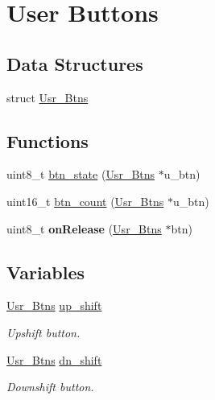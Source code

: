 \hypertarget{group__usr_btns}{\section{User Buttons}
\label{group__usr_btns}
}
\subsection*{Data Structures}
\begin{DoxyCompactItemize}
\item 
struct \hyperlink{struct_usr___btns}{Usr\-\_\-\-Btns}
\end{DoxyCompactItemize}
\subsection*{Functions}
\begin{DoxyCompactItemize}
\item 
uint8\-\_\-t \hyperlink{group__usr_btns_ga12edd371195cb085c440d64794fdf9ea}{btn\-\_\-state} (\hyperlink{struct_usr___btns}{Usr\-\_\-\-Btns} $\ast$u\-\_\-btn)
\item 
uint16\-\_\-t \hyperlink{group__usr_btns_ga10ac2ecdef1d96d9ef177f948817bbb3}{btn\-\_\-count} (\hyperlink{struct_usr___btns}{Usr\-\_\-\-Btns} $\ast$u\-\_\-btn)
\item 
\hypertarget{group__usr_btns_ga2f0699e265a6cc26a98e3470366b5cda}{uint8\-\_\-t {\bfseries on\-Release} (\hyperlink{struct_usr___btns}{Usr\-\_\-\-Btns} $\ast$btn)}\label{group__usr_btns_ga2f0699e265a6cc26a98e3470366b5cda}

\end{DoxyCompactItemize}
\subsection*{Variables}
\begin{DoxyCompactItemize}
\item 
\hypertarget{group__usr_btns_ga18ee634a9df9ed1ca0c7af2e021cec0f}{\hyperlink{struct_usr___btns}{Usr\-\_\-\-Btns} \hyperlink{group__usr_btns_ga18ee634a9df9ed1ca0c7af2e021cec0f}{up\-\_\-shift}}\label{group__usr_btns_ga18ee634a9df9ed1ca0c7af2e021cec0f}

\begin{DoxyCompactList}\small\item\em Upshift button. \end{DoxyCompactList}\item 
\hypertarget{group__usr_btns_gafd0b4b5ca080e04e71e4308414dc58ed}{\hyperlink{struct_usr___btns}{Usr\-\_\-\-Btns} \hyperlink{group__usr_btns_gafd0b4b5ca080e04e71e4308414dc58ed}{dn\-\_\-shift}}\label{group__usr_btns_gafd0b4b5ca080e04e71e4308414dc58ed}

\begin{DoxyCompactList}\small\item\em Downshift button. \end{DoxyCompactList}\end{DoxyCompactItemize}


